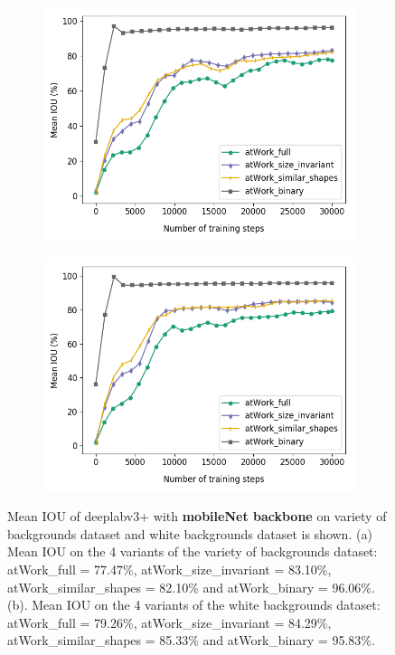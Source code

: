 	\begin{figure}
		\begin{subfigure}{.5\textwidth}
			\centering
			\includegraphics[width=1\linewidth]{images/mobi_4vars}
			\label{Fig:mobivarsa}
			\caption{}
		\end{subfigure}
		\begin{subfigure}{.5\textwidth}
			\centering
			\includegraphics[width=1\linewidth]{images/mobi_4vars_white}
			\label{Fig:mobivarsb}
			\caption{}
		\end{subfigure}
		\caption{Mean IOU of deeplabv3+ with \textbf{mobileNet backbone} on variety of backgrounds dataset and white backgrounds dataset is shown. (a) Mean IOU on the 4 variants of the variety of backgrounds dataset: atWork\_full = 77.47\%, atWork\_size\_invariant = 83.10\%, atWork\_similar\_shapes = 82.10\% and atWork\_binary = 96.06\%. (b). Mean IOU on the 4 variants of the white backgrounds dataset: atWork\_full = 79.26\%, atWork\_size\_invariant = 84.29\%, atWork\_similar\_shapes = 85.33\% and atWork\_binary = 95.83\%.}
		\label{Fig:mobivars}
	\end{figure}
	
